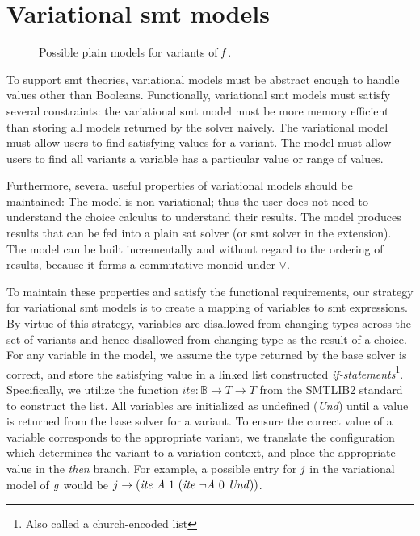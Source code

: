 \section{Variational \ac{smt} models}
\begin{figure}[h]
    \centering
    \caption{Possible plain models for variants of $\mathit{f}$. }%
    \label{fig:vsmt:models:plain}
\end{figure}
To support \ac{smt} theories, variational models must be abstract enough to
handle values other than Booleans. Functionally, variational \ac{smt} models
must satisfy several constraints: the variational \ac{smt} model must be more
memory efficient than storing all models returned by the solver naively. The
variational model must allow users to find satisfying values for a variant. The
model must allow users to find all variants a variable has a particular value or
range of values.

Furthermore, several useful properties of variational models should be
maintained: The model is non-variational; thus the user does not need to
understand the choice calculus to understand their results. The model produces
results that can be fed into a plain \ac{sat} solver (or \ac{smt} solver in the
extension). The model can be built incrementally and without regard to the
ordering of results, because it forms a commutative monoid under $\vee$.

To maintain these properties and satisfy the functional requirements, our
strategy for variational \ac{smt} models is to create a mapping of variables to
\ac{smt} expressions. By virtue of this strategy, variables are disallowed from
changing types across the set of variants and hence disallowed from changing
type as the result of a choice. For any variable in the model, we assume the
type returned by the base solver is correct, and store the satisfying value in a
linked list constructed \emph{if-statements}\footnote{Also called a
  church-encoded list}. Specifically, we utilize the function $ite : \mathbb{B}
\rightarrow T \rightarrow T$ from the SMTLIB2 standard to construct the list.
All variables are initialized as undefined (\emph{Und}) until a value is
returned from the base solver for a variant. To ensure the correct value of a
variable corresponds to the appropriate variant, we translate the configuration
which determines the variant to a variation context, and place the appropriate
value in the \emph{then} branch. For example, a possible entry for $\mathit{j}$ in
the variational model of $\mathit{g}$ would be $j \rightarrow (\mathit{ite}\ \mathit{A}\ 1\
(\mathit{ite}\ \neg\mathit{A}\ 0\ \mathit{Und}))$.

